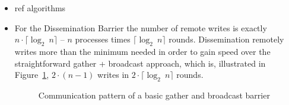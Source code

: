 \documentclass[a4paper, 10pt]{article}
\begin{document}
\begin{itemize}
	\item ref algorithms
	\item For the Dissemination Barrier the number of remote writes is exactly $n \cdot \lceil \log _2~n \rceil$ -- $n$ processes times $\lceil \log _2~n \rceil$ rounds. Dissemination remotely writes more than the minimum needed in order to gain speed over the straightforward gather + broadcast approach, which is, illustrated in Figure~\ref{fig:diagram-gather-broadcast}, $2 \cdot (n-1)$ writes in $2 \cdot  \lceil \log _2~n \rceil$ rounds.
		\begin{figure}[htbp]
			\centering
			
			\caption{Communication pattern of a basic gather and broadcast barrier}
			\label{fig:diagram-gather-broadcast}
		\end{figure}


\end{itemize}
\end{document}
